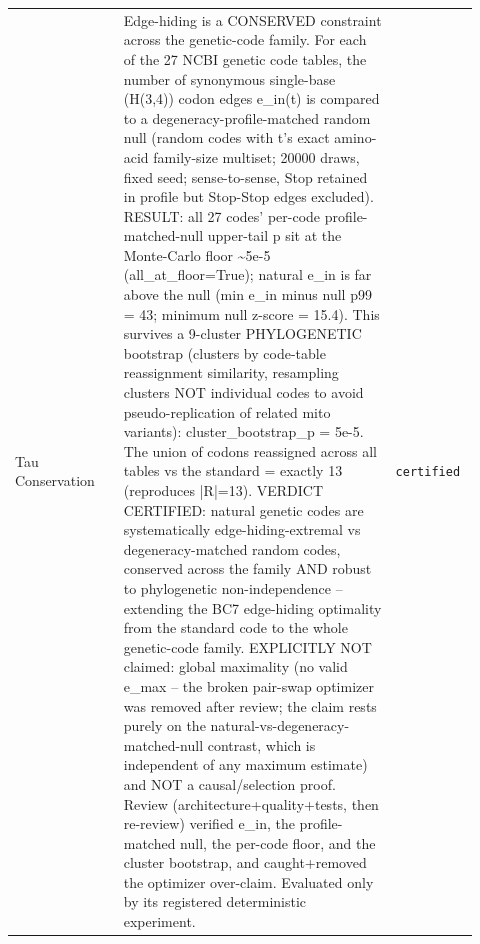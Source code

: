 \begin{longtable}{>{\raggedright\arraybackslash}p{0.22\linewidth}>{\raggedright\arraybackslash}p{0.55\linewidth}>{\raggedright\arraybackslash}p{0.15\linewidth}}
Tau Conservation & Edge-hiding is a CONSERVED constraint across the genetic-code family. For each of the 27 NCBI genetic code tables, the number of synonymous single-base (H(3,4)) codon edges e\_in(t) is compared to a degeneracy-profile-matched random null (random codes with t's exact amino-acid family-size multiset; 20000 draws, fixed seed; sense-to-sense, Stop retained in profile but Stop-Stop edges excluded). RESULT: all 27 codes' per-code profile-matched-null upper-tail p sit at the Monte-Carlo floor \textasciitilde{}5e-5 (all\_at\_floor=True); natural e\_in is far above the null (min e\_in minus null p99 = 43; minimum null z-score = 15.4). This survives a 9-cluster PHYLOGENETIC bootstrap (clusters by code-table reassignment similarity, resampling clusters NOT individual codes to avoid pseudo-replication of related mito variants): cluster\_bootstrap\_p = 5e-5. The union of codons reassigned across all tables vs the standard = exactly 13 (reproduces |R|=13). VERDICT CERTIFIED: natural genetic codes are systematically edge-hiding-extremal vs degeneracy-matched random codes, conserved across the family AND robust to phylogenetic non-independence -- extending the BC7 edge-hiding optimality from the standard code to the whole genetic-code family. EXPLICITLY NOT claimed: global maximality (no valid e\_max -- the broken pair-swap optimizer was removed after review; the claim rests purely on the natural-vs-degeneracy-matched-null contrast, which is independent of any maximum estimate) and NOT a causal/selection proof. Review (architecture+quality+tests, then re-review) verified e\_in, the profile-matched null, the per-code floor, and the cluster bootstrap, and caught+removed the optimizer over-claim. Evaluated only by its registered deterministic experiment. & \texttt{certified} \\

\end{longtable}
